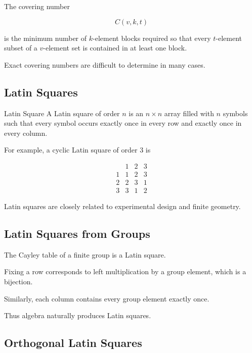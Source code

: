 The covering number

\[
\boxed{
C(v,k,t)
}
\]

is the minimum number of \(k\)-element blocks required so that every
\(t\)-element subset of a \(v\)-element set is contained in at least one
block.

Exact covering numbers are difficult to determine in many cases.

\subsection{Latin Squares}
\label{subsec:latin-squares}

\begin{definitionbox}{Latin Square}
A Latin square of order \(n\) is an \(n\times n\) array filled with
\(n\) symbols such that every symbol occurs exactly once in every row
and exactly once in every column.
\end{definitionbox}

For example, a cyclic Latin square of order \(3\) is

\[
\begin{array}{c|ccc}
 &1&2&3\\
\hline
1&1&2&3\\
2&2&3&1\\
3&3&1&2
\end{array}
\]

Latin squares are closely related to experimental design and finite
geometry.

\subsection{Latin Squares from Groups}
\label{subsec:latin-squares-groups}

The Cayley table of a finite group is a Latin square.

Fixing a row corresponds to left multiplication by a group element,
which is a bijection.

Similarly, each column contains every group element exactly once.

Thus algebra naturally produces Latin squares.

\subsection{Orthogonal Latin Squares}
\label{subsec:orthogonal-latin-squares}

